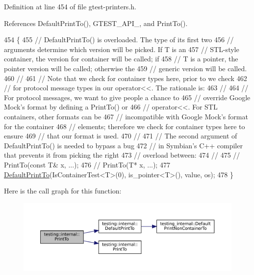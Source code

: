 Definition at line 454 of file gtest-\/printers.\+h.



References Default\+Print\+To(), G\+T\+E\+S\+T\+\_\+\+A\+P\+I\+\_\+, and Print\+To().


\begin{DoxyCode}
454                                              \{
455   \textcolor{comment}{// DefaultPrintTo() is overloaded.  The type of its first two}
456   \textcolor{comment}{// arguments determine which version will be picked.  If T is an}
457   \textcolor{comment}{// STL-style container, the version for container will be called; if}
458   \textcolor{comment}{// T is a pointer, the pointer version will be called; otherwise the}
459   \textcolor{comment}{// generic version will be called.}
460   \textcolor{comment}{//}
461   \textcolor{comment}{// Note that we check for container types here, prior to we check}
462   \textcolor{comment}{// for protocol message types in our operator<<.  The rationale is:}
463   \textcolor{comment}{//}
464   \textcolor{comment}{// For protocol messages, we want to give people a chance to}
465   \textcolor{comment}{// override Google Mock's format by defining a PrintTo() or}
466   \textcolor{comment}{// operator<<.  For STL containers, other formats can be}
467   \textcolor{comment}{// incompatible with Google Mock's format for the container}
468   \textcolor{comment}{// elements; therefore we check for container types here to ensure}
469   \textcolor{comment}{// that our format is used.}
470   \textcolor{comment}{//}
471   \textcolor{comment}{// The second argument of DefaultPrintTo() is needed to bypass a bug}
472   \textcolor{comment}{// in Symbian's C++ compiler that prevents it from picking the right}
473   \textcolor{comment}{// overload between:}
474   \textcolor{comment}{//}
475   \textcolor{comment}{//   PrintTo(const T& x, ...);}
476   \textcolor{comment}{//   PrintTo(T* x, ...);}
477   \hyperlink{namespacetesting_1_1internal_a78e4937ba564f01dac2ff25f3eece0ec}{DefaultPrintTo}(IsContainerTest<T>(0), is\_pointer<T>(), value, os);
478 \}
\end{DoxyCode}
Here is the call graph for this function\+:
\nopagebreak
\begin{figure}[H]
\begin{center}
\leavevmode
\includegraphics[width=350pt]{namespacetesting_1_1internal_adb3c27150dbe661db0e0c4be27533460_cgraph}
\end{center}
\end{figure}
\mbox{\label{namespacetesting_1_1internal_ab7524d6d3ab8c31b1deea88bf61783bb}} 
